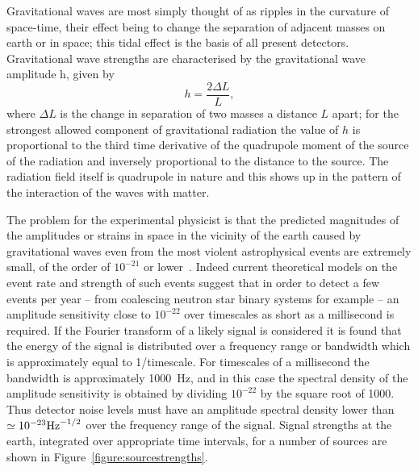 \documentclass{article}
\begin{document}
Gravitational waves are most simply thought of as ripples in the curvature of
space-time, their effect being to change the separation of adjacent masses on
earth or in space; this tidal effect is the basis of all present detectors.
Gravitational wave strengths are characterised by the gravitational wave
amplitude h, given by
%
\begin{equation}
  h = \frac{2 \Delta L} L,
  \label{equation:h}
\end{equation}
%
where $\Delta L$ is the change in separation of two masses a distance $L$ apart;
for the strongest allowed component of gravitational radiation the value of $h$
is proportional to the third time derivative of the quadrupole moment of the
source of the radiation and inversely proportional to the distance to the
source. The radiation field itself is quadrupole in nature and this shows up in
the pattern of the interaction of the waves with matter.

The problem for the experimental physicist is that the predicted magnitudes of
the amplitudes or strains in space in the vicinity of the earth caused by
gravitational waves even from the most violent astrophysical events are
extremely small, of the order of $10^{-21}$ or lower~\cite{Sathyaprakash:2009,
LISAsymposium}. Indeed current theoretical models on the event rate and strength
of such events suggest that in order to detect a few events per year -- from
coalescing neutron star binary systems for example -- an amplitude sensitivity
close to $10^{-22}$ over timescales as short as a millisecond is required. If
the Fourier transform of a likely signal is considered it is found that the
energy of the signal is distributed over a frequency range or bandwidth which is
approximately equal to 1/timescale.  For timescales of a millisecond the
bandwidth is approximately 1000~Hz, and in this case the spectral density of the
amplitude sensitivity is obtained by dividing $10^{-22}$ by the square root of
1000. Thus detector noise levels must have an amplitude spectral density lower
than $\simeq 10^{-23}{\rm Hz}^{-1/2}$ over the frequency range of the signal.
Signal strengths at the earth, integrated over appropriate time intervals, for a
number of sources are shown in Figure~\ref{figure:sourcestrengths}.
\end{document}
